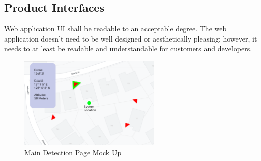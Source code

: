 \subsection{Product Interfaces}
Web application UI shall be readable to an acceptable degree.  The web application doesn't need to be well designed or aesthetically pleasing; however, it needs to at least be readable and understandable for customers and developers.
\begin{figure}[h!]
	\centering
   	\includegraphics[width=0.60\textwidth]{images/Group 1.png}
   	\caption{Main Detection Page Mock Up}
\end{figure}
